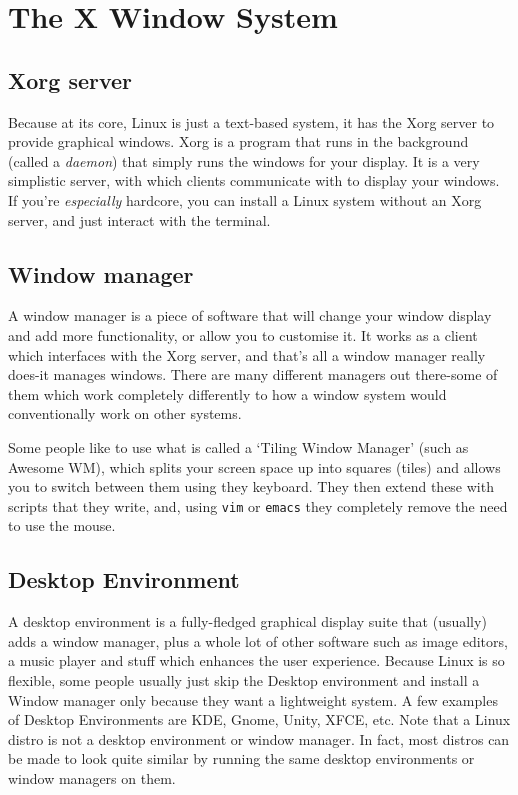 \documentclass{article}
\begin{document}
\section{The X Window System}

\subsection{Xorg server}
Because at its core, Linux is just a text-based system, it has the Xorg server to provide graphical windows. Xorg is a program that runs in the background (called a \emph{daemon}) that simply runs the windows for your display. It is a very simplistic server, with which clients communicate with to display your windows. If you're \emph{especially} hardcore, you can install a Linux system without an Xorg server, and just interact with the terminal. 

\subsection{Window manager}
A window manager is a piece of software that will change your window display and add more functionality, or allow you to customise it. It works as a client which interfaces with the Xorg server, and that's all a window manager really does-it manages windows. There are many different managers out there-some of them which work completely differently to how a window system would conventionally work on other systems. 

Some people like to use what is called a `Tiling Window Manager' (such as Awesome WM), which splits your screen space up into squares (tiles) and allows you to switch between them using they keyboard. They then extend these with scripts that they write, and, using \texttt{vim} or \texttt{emacs} they completely remove the need to use the mouse.

\subsection{Desktop Environment}
A desktop environment is a fully-fledged graphical display suite that (usually) adds a window manager, plus a whole lot of other software such as image editors, a music player and stuff which enhances the user experience. Because Linux is so flexible, some people usually just skip the Desktop environment and install a Window manager only because they want a lightweight system. A few examples of Desktop Environments are KDE, Gnome, Unity, XFCE, etc. Note that a Linux distro is not a desktop environment or window manager. In fact, most distros can be made to look quite similar by running the same desktop environments or window managers on them.
\end{document}
